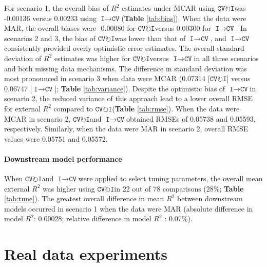 \documentclass[AMA,STIX1COL,doublespace]{WileyNJD-v2}
\begin{document}
For scenario 1, the overall bias of \(R^2\) estimates under MCAR using
$\texttt{CV}\!\circlearrowright\!\texttt{I}$\space was -0.00136 versus
0.00233 using
$\texttt{I}\!\!\rightarrow\!\texttt{CV}$\space (\textbf{Table}
\ref{tab:bias}). When the data were MAR, the overall biases were
-0.00080 for $\texttt{CV}\!\circlearrowright\!\texttt{I}$\space versus
0.00300 for $\texttt{I}\!\!\rightarrow\!\texttt{CV}$\space. In scenarios
2 and 3, the bias of
$\texttt{CV}\!\circlearrowright\!\texttt{I}$\space was lower than that
of $\texttt{I}\!\!\rightarrow\!\texttt{CV}$\space, and
$\texttt{I}\!\!\rightarrow\!\texttt{CV}$\space consistently provided
overly optimistic error estimates. The overall standard deviation of
\(R^2\) estimates was higher for
$\texttt{CV}\!\circlearrowright\!\texttt{I}$\space versus
$\texttt{I}\!\!\rightarrow\!\texttt{CV}$\space in all three scenarios
and both missing data mechanisms. The difference in standard deviation
was most pronounced in scenario 3 when data were MCAR (0.07314
{[}$\texttt{CV}\!\circlearrowright\!\texttt{I}${]} versus 0.06747
{[}$\texttt{I}\!\!\rightarrow\!\texttt{CV}${]}; \textbf{Table}
\ref{tab:variance}). Despite the optimistic bias of
$\texttt{I}\!\!\rightarrow\!\texttt{CV}$\space in scenario 2, the
reduced variance of this approach lead to a lower overall RMSE for
external \(R^2\) compared to
$\texttt{CV}\!\circlearrowright\!\texttt{I}$\space (\textbf{Table}
\ref{tab:rmse}). When the data were MCAR in scenario 2,
$\texttt{CV}\!\circlearrowright\!\texttt{I}$\space and
$\texttt{I}\!\!\rightarrow\!\texttt{CV}$\space obtained RMSEs of 0.05738
and 0.05593, respectively. Similarly, when the data were MAR in scenario
2, overall RMSE values were 0.05751 and 0.05572.

\paragraph{Downstream model performance}

When $\texttt{CV}\!\circlearrowright\!\texttt{I}$\space and
$\texttt{I}\!\!\rightarrow\!\texttt{CV}$\space were applied to select
tuning parameters, the overall mean external \(R^2\) was higher using
$\texttt{CV}\!\circlearrowright\!\texttt{I}$\space in 22 out of 78
comparisons (28\%; \textbf{Table} \ref{tab:tune}). The greatest overall
difference in mean \(R^2\) between downstream models occurred in
scenario 1 when the data were MAR (absolute difference in model \(R^2\):
0.00028; relative difference in model \(R^2\) : 0.07\%).

\section{Real data experiments} \label{sec:app}
\end{document}
